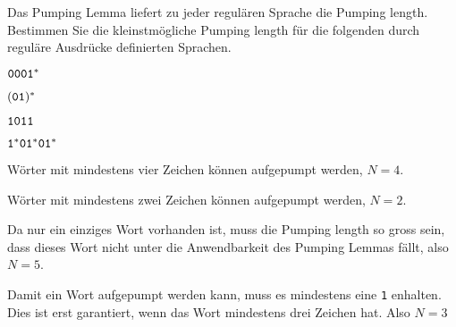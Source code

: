 Das Pumping Lemma liefert zu jeder regulären Sprache die Pumping length.
Bestimmen Sie die kleinstmögliche Pumping length für die folgenden
durch reguläre Ausdrücke definierten Sprachen.
\begin{teilaufgaben}
\item ${\tt 0001}^*$
\item $({\tt 01})^*$
\item ${\tt 1011}$
\item ${\tt 1}^*{\tt 01}^*{\tt 01}^*$
\end{teilaufgaben}


\begin{loesung}
\begin{teilaufgaben}
\item Wörter mit mindestens vier Zeichen können aufgepumpt werden,
$N=4$.
\item Wörter mit mindestens zwei Zeichen können aufgepumpt werden,
$N=2$.
\item Da nur ein einziges Wort vorhanden ist, muss die Pumping length
so gross sein, dass dieses Wort nicht unter die Anwendbarkeit des
Pumping Lemmas fällt, also $N=5$.
\item Damit ein Wort aufgepumpt werden kann, muss es mindestens eine
{\tt 1} enhalten. Dies ist erst garantiert, wenn das Wort  mindestens
drei Zeichen hat. Also $N=3$
\qedhere
\end{teilaufgaben}
\end{loesung}
